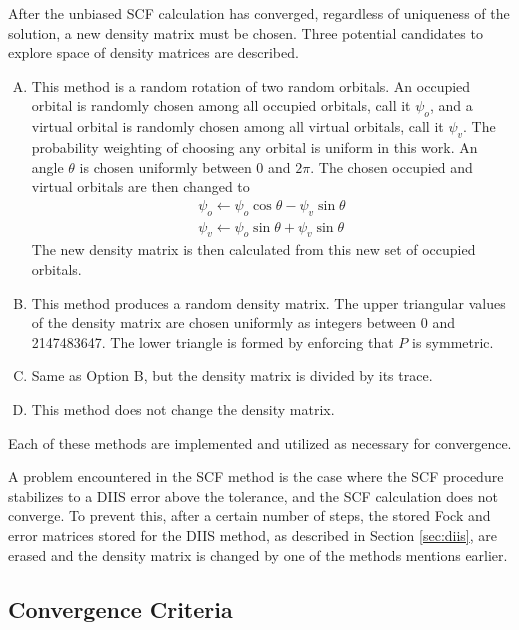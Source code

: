 \documentclass[final,3p,times,twocolumn]{elsarticle}
\begin{document}
After the unbiased SCF calculation has converged, regardless of uniqueness of the solution, a new density matrix must be chosen. Three potential candidates to explore space of density matrices are described.
\begin{enumerate}[A.]
\item This method is a random rotation of two random orbitals. An occupied orbital is randomly chosen among all occupied orbitals, call it $\psi_o$, and a virtual orbital is randomly chosen among all virtual orbitals, call it $\psi_v$. The probability weighting of choosing any orbital is uniform in this work. An angle $\theta$ is chosen uniformly between $0$ and $2\pi$. The chosen occupied and virtual orbitals are then changed to
\begin{subequations}
\begin{gather}
\psi_o \leftarrow \psi_o \cos\theta - \psi_v \sin\theta \\
\psi_v \leftarrow \psi_o \sin\theta + \psi_v \sin\theta
\end{gather} 
\end{subequations}
The new density matrix is then calculated from this new set of occupied orbitals.

\item This method produces a random density matrix. The upper triangular values of the density matrix are chosen uniformly as integers between 0 and 2147483647. The lower triangle is formed by enforcing that $P$ is symmetric.

\item Same as Option B, but the density matrix is divided by its trace.

\item This method does not change the density matrix.

\end{enumerate}
Each of these methods are implemented and utilized as necessary for convergence.

A problem encountered in the SCF method is the case where the SCF procedure stabilizes to a DIIS error above the tolerance, and the SCF calculation does not converge. To prevent this, after a certain number of steps, the stored Fock and error matrices stored for the DIIS method, as described in Section \ref{sec:diis}, are erased and the density matrix is changed by one of the methods mentions earlier.

\subsection{Convergence Criteria} \label{sec:alg-conv}
\end{document}
